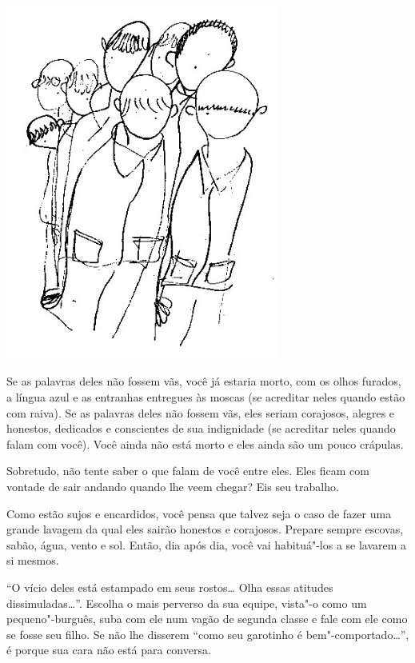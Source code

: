 \begin{center}
\includegraphics[width=90mm]{./imgs/Image_10.jpg}
\end{center}

Se as palavras deles não fossem vãs, você já estaria morto, com os olhos
furados, a língua azul e as entranhas entregues às moscas (se acreditar
neles quando estão com raiva). Se as palavras deles não fossem vãs, eles
seriam corajosos, alegres e honestos, dedicados e conscientes de sua
indignidade (se acreditar neles quando falam com você). Você ainda não
está morto e eles ainda são um pouco crápulas.

\bigskip
\bigskip

Sobretudo, não tente saber o que falam de você entre eles. Eles ficam
com vontade de sair andando quando lhe veem chegar? Eis seu trabalho.

\bigskip
\bigskip

Como estão sujos e encardidos, você pensa que talvez seja o caso de
fazer uma grande lavagem da qual eles sairão honestos e corajosos.
Prepare sempre escovas, sabão, água, vento e sol. Então, dia após dia,
você vai habituá"-los a se lavarem a si mesmos.

\bigskip
\bigskip

``O vício deles está estampado em seus rostos\ldots{} Olha essas atitudes
dissimuladas\ldots{}''. Escolha o mais perverso da sua equipe, vista"-o como
um pequeno"-burguês, suba com ele num vagão de segunda classe e fale com
ele como se fosse seu filho. Se não lhe disserem ``como seu garotinho é
bem"-comportado\ldots{}'', é porque sua cara não está para conversa.

